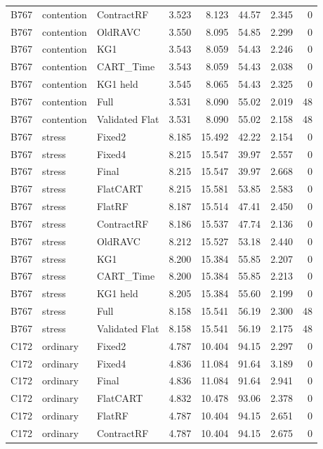 \begin{longtable}{@{}lllrrrrr@{}}
B767 & contention & ContractRF & 3.523 & 8.123 & 44.57 & 2.345 & 0\\
B767 & contention & OldRAVC & 3.550 & 8.095 & 54.85 & 2.299 & 0\\
B767 & contention & KG1 & 3.543 & 8.059 & 54.43 & 2.246 & 0\\
B767 & contention & CART\_Time & 3.543 & 8.059 & 54.43 & 2.038 & 0\\
B767 & contention & KG1 held & 3.545 & 8.065 & 54.43 & 2.325 & 0\\
B767 & contention & Full & 3.531 & 8.090 & 55.02 & 2.019 & 48\\
B767 & contention & Validated Flat & 3.531 & 8.090 & 55.02 & 2.158 & 48\\
B767 & stress & Fixed2 & 8.185 & 15.492 & 42.22 & 2.154 & 0\\
B767 & stress & Fixed4 & 8.215 & 15.547 & 39.97 & 2.557 & 0\\
B767 & stress & Final & 8.215 & 15.547 & 39.97 & 2.668 & 0\\
B767 & stress & FlatCART & 8.215 & 15.581 & 53.85 & 2.583 & 0\\
B767 & stress & FlatRF & 8.187 & 15.514 & 47.41 & 2.450 & 0\\
B767 & stress & ContractRF & 8.186 & 15.537 & 47.74 & 2.136 & 0\\
B767 & stress & OldRAVC & 8.212 & 15.527 & 53.18 & 2.440 & 0\\
B767 & stress & KG1 & 8.200 & 15.384 & 55.85 & 2.207 & 0\\
B767 & stress & CART\_Time & 8.200 & 15.384 & 55.85 & 2.213 & 0\\
B767 & stress & KG1 held & 8.205 & 15.384 & 55.60 & 2.199 & 0\\
B767 & stress & Full & 8.158 & 15.541 & 56.19 & 2.300 & 48\\
B767 & stress & Validated Flat & 8.158 & 15.541 & 56.19 & 2.175 & 48\\
C172 & ordinary & Fixed2 & 4.787 & 10.404 & 94.15 & 2.297 & 0\\
C172 & ordinary & Fixed4 & 4.836 & 11.084 & 91.64 & 3.189 & 0\\
C172 & ordinary & Final & 4.836 & 11.084 & 91.64 & 2.941 & 0\\
C172 & ordinary & FlatCART & 4.832 & 10.478 & 93.06 & 2.378 & 0\\
C172 & ordinary & FlatRF & 4.787 & 10.404 & 94.15 & 2.651 & 0\\
C172 & ordinary & ContractRF & 4.787 & 10.404 & 94.15 & 2.675 & 0\\

\end{longtable}
